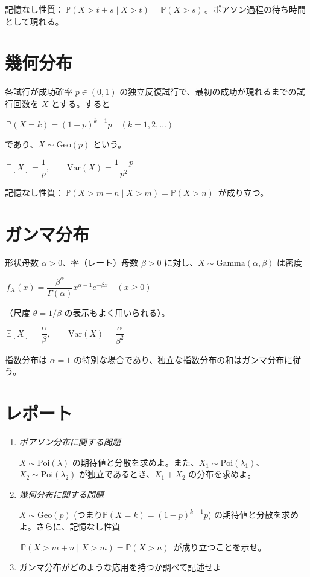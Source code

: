 \documentclass[uplatex,dvipdfmx,11pt,a4paper,openany]{bxjsbook}
\begin{document}
記憶なし性質：$\,\mathbb{P}(X>t+s\mid X>t)=\mathbb{P}(X>s)\,$。ポアソン過程の待ち時間として現れる。

\section{幾何分布}
各試行が成功確率 $p\in(0,1)$ の独立反復試行で、最初の成功が現れるまでの試行回数を $X$ とする。すると

$\,\mathbb{P}(X=k)=(1-p)^{k-1}p\quad(k=1,2,\dots)\,$

であり、$X\sim\mathrm{Geo}(p)$ という。

$\,\mathbb{E}[X]=\dfrac{1}{p},\qquad \mathrm{Var}(X)=\dfrac{1-p}{p^2}\,$

記憶なし性質：$\,\mathbb{P}(X>m+n\mid X>m)=\mathbb{P}(X>n)\,$ が成り立つ。

\section{ガンマ分布}
形状母数 $\alpha>0$、率（レート）母数 $\beta>0$ に対し、$X\sim\mathrm{Gamma}(\alpha,\beta)$ は密度

$\,f_X(x)=\dfrac{\beta^\alpha}{\Gamma(\alpha)}x^{\alpha-1}e^{-\beta x}\quad(x\ge0)\,$

（尺度 $\theta=1/\beta$ の表示もよく用いられる）。

$\,\mathbb{E}[X]=\dfrac{\alpha}{\beta},\qquad \mathrm{Var}(X)=\dfrac{\alpha}{\beta^2}\,$

指数分布は $\alpha=1$ の特別な場合であり、独立な指数分布の和はガンマ分布に従う。

\section{レポート}
\begin{enumerate}
\item \emph{ポアソン分布に関する問題}

              $X\sim\mathrm{Poi}(\lambda)$ の期待値と分散を求めよ。また、$X_1\sim\mathrm{Poi}(\lambda_1)$、$X_2\sim\mathrm{Poi}(\lambda_2)$ が独立であるとき、$X_1+X_2$ の分布を求めよ。
\item \emph{幾何分布に関する問題}

              $X\sim\mathrm{Geo}(p)$ (つまり$\mathbb P(X=k)=(1-p)^{k-1}p$) の期待値と分散を求めよ。さらに、記憶なし性質
            
$\,\mathbb{P}(X>m+n\mid X>m)=\mathbb{P}(X>n)\,$
が成り立つことを示せ。
\item ガンマ分布がどのような応用を持つか調べて記述せよ
\end{enumerate}
\end{document}
